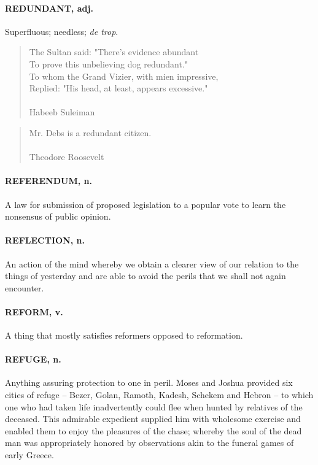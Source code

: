 \documentclass[11pt]{article}
\begin{document}
\paragraph{REDUNDANT, adj.}  Superfluous; needless; {\em de trop}.

\begin{quote}   The Sultan said:  "There's evidence abundant \\
  To prove this unbelieving dog redundant." \\
  To whom the Grand Vizier, with mien impressive, \\
  Replied:  "His head, at least, appears excessive." \\
 \\
Habeeb Suleiman \end{quote}


\begin{quote}   Mr. Debs is a redundant citizen. \\
 \\
Theodore Roosevelt \end{quote}


\paragraph{REFERENDUM, n.}  A law for submission of proposed legislation to a
popular vote to learn the nonsensus of public opinion.

\paragraph{REFLECTION, n.}  An action of the mind whereby we obtain a clearer view
of our relation to the things of yesterday and are able to avoid the
perils that we shall not again encounter.

\paragraph{REFORM, v.}  A thing that mostly satisfies reformers opposed to
reformation.

\paragraph{REFUGE, n.}  Anything assuring protection to one in peril.  Moses and
Joshua provided six cities of refuge -- Bezer, Golan, Ramoth, Kadesh,
Schekem and Hebron -- to which one who had taken life inadvertently
could flee when hunted by relatives of the deceased.  This admirable
expedient supplied him with wholesome exercise and enabled them to
enjoy the pleasures of the chase; whereby the soul of the dead man was
appropriately honored by observations akin to the funeral games of
early Greece.
\end{document}

